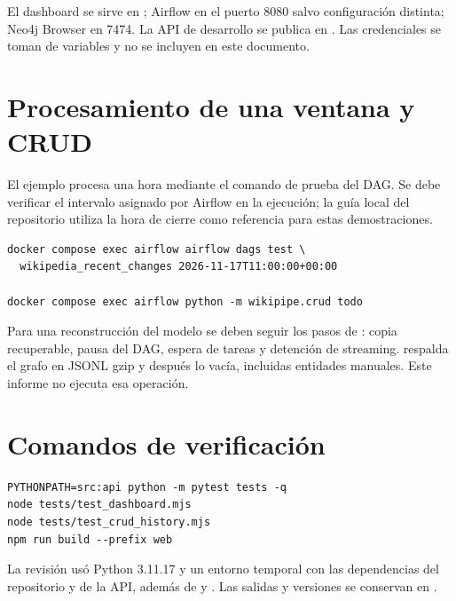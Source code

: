 El dashboard se sirve en ; Airflow en el puerto 8080 salvo configuración distinta; Neo4j Browser en 7474. La API de desarrollo se publica en . Las credenciales se toman de variables y no se incluyen en este documento.

\section{Procesamiento de una ventana y CRUD}
El ejemplo procesa una hora mediante el comando de prueba del DAG. Se debe verificar el intervalo asignado por Airflow en la ejecución; la guía local del repositorio utiliza la hora de cierre como referencia para estas demostraciones.
\par\noindent\begin{minipage}{\linewidth}
\begin{lstlisting}
docker compose exec airflow airflow dags test \
  wikipedia_recent_changes 2026-11-17T11:00:00+00:00

docker compose exec airflow python -m wikipipe.crud todo
\end{lstlisting}
\end{minipage}\par

Para una reconstrucción del modelo se deben seguir los pasos de : copia recuperable, pausa del DAG, espera de tareas y detención de streaming.  respalda el grafo en JSONL gzip y después lo vacía, incluidas entidades manuales. Este informe no ejecuta esa operación.

\section{Comandos de verificación}
\par\noindent\begin{minipage}{\linewidth}
\begin{lstlisting}
PYTHONPATH=src:api python -m pytest tests -q
node tests/test_dashboard.mjs
node tests/test_crud_history.mjs
npm run build --prefix web
\end{lstlisting}
\end{minipage}\par
La revisión usó Python 3.11.17 y un entorno temporal con las dependencias del repositorio y de la API, además de  y . Las salidas y versiones se conservan en .

